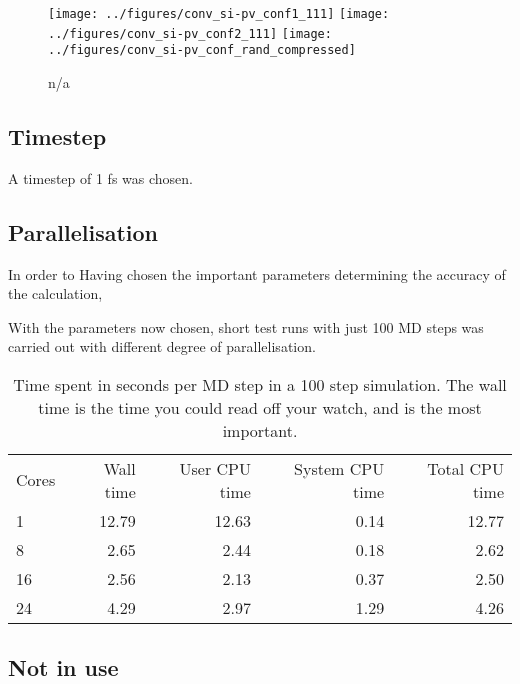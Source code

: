 \documentclass[11pt,bibliography=totoc,index=totoc]{scrbook}   %
\begin{document}
\begin{figure}[htbp]
  \begin{center}
    \texttt{[image: ../figures/conv\_si-pv\_conf1\_111]}
    \texttt{[image: ../figures/conv\_si-pv\_conf2\_111]}
    \texttt{[image: ../figures/conv\_si-pv\_conf\_rand\_compressed]}
  \end{center}
  \caption{n/a}
  \label{fig:figs/conv_si-pv_conf}
\end{figure}




\subsection{Timestep}

A timestep of 1 fs was chosen.

\cite{Richie:2004}


\subsection{Parallelisation}

In order to 
Having chosen the important parameters determining the accuracy of the calculation, 

With the parameters now chosen, short test runs with just 100 MD steps was carried out with different degree of parallelisation.


\begin{table}[htbp]
  \centering
  \begin{tabular}{lrrrr}
    Cores & Wall time & User CPU time & System CPU time & Total CPU time \\
    1     & 12.79 & 12.63 & 0.14 & 12.77 \\
    8     & 2.65 & 2.44 & 0.18 & 2.62 \\
    16    & 2.56 & 2.13 & 0.37 & 2.50 \\
    24    & 4.29 & 2.97 & 1.29 & 4.26 \\
  \end{tabular}
  \caption{Time spent in seconds per MD step in a 100 step simulation. The wall time is the time you could read off your watch, and is the most important.}
  \label{tab:}
\end{table}


\subsection{Not in use}
\end{document}
